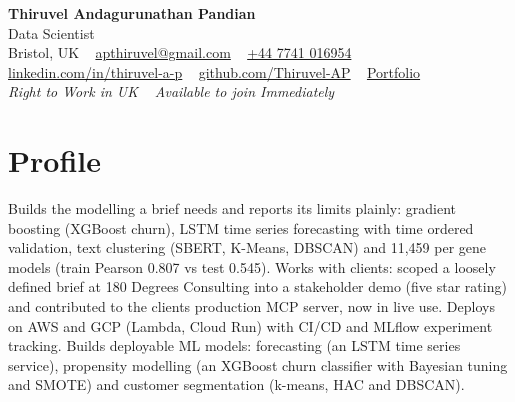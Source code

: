 \documentclass[a4paper,11pt]{article}
\begin{document}
\begin{center}
  {\fontsize{22}{26}\selectfont\bfseries\color{navy} Thiruvel Andagurunathan Pandian}\\[4pt]
  {\fontsize{12}{14}\selectfont\color{navy} Data Scientist}\\[4pt]
  {\small
  Bristol, UK\nobreak\ \,\textperiodcentered\, \href{mailto:apthiruvel@gmail.com}{apthiruvel@gmail.com}\nobreak\ \,\textperiodcentered\, \href{tel:+447741016954}{+44 7741 016954}\nobreak\ \,\textperiodcentered\, \href{https://www.linkedin.com/in/thiruvel-a-p/}{linkedin.com/in/thiruvel-a-p}\nobreak\ \,\textperiodcentered\, \href{https://github.com/Thiruvel-AP}{github.com/Thiruvel-AP}\nobreak\ \,\textperiodcentered\, \href{https://thiruvel-ap.github.io/PersonalPortfolio/}{Portfolio}}\\[3pt]
  {\small\itshape\color{muted} Right to Work in UK\nobreak\ \,\textperiodcentered\, Available to join Immediately}

\end{center}

\section{Profile}
Builds the modelling a brief needs and reports its limits plainly: gradient boosting (XGBoost churn), LSTM time series forecasting with time ordered validation, text clustering (SBERT, K-Means, DBSCAN) and 11,459 per gene models (train Pearson 0.807 vs test 0.545). Works with clients: scoped a loosely defined brief at 180 Degrees Consulting into a stakeholder demo (five star rating) and contributed to the client\textquotesingle{}s production MCP server, now in live use. Deploys on AWS and GCP (Lambda, Cloud Run) with CI/CD and MLflow experiment tracking. Builds deployable ML models: forecasting (an LSTM time series service), propensity modelling (an XGBoost churn classifier with Bayesian tuning and SMOTE) and customer segmentation (k-means, HAC and DBSCAN).
\end{document}
